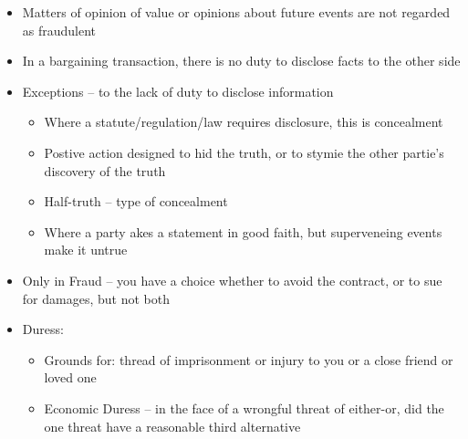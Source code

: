 \documentclass{article}
\begin{document}
\begin{itemize}
\begin{itemize}
		\end{itemize}
		\item Matters of opinion of value or opinions about future events are not regarded as fraudulent
		\item In a bargaining transaction, there is no duty to disclose facts to the other side
		\item Exceptions -- to the lack of duty to disclose information
		\begin{itemize}
			\item Where a statute/regulation/law requires disclosure, this is concealment
			\item Postive action designed to hid the truth, or to stymie the other partie's discovery of the truth
			\item Half-truth -- type of concealment
			\item Where a party akes a statement in good faith, but superveneing events make it untrue
		\end{itemize}
		\item Only in Fraud -- you have a choice whether to avoid the contract, or to sue for damages, but not both
		\item Duress:
		\begin{itemize}
			\item Grounds for: thread of imprisonment or injury to you or a close friend or loved one
			\item Economic Duress -- in the face of a wrongful threat of either-or, did the one threat have a reasonable third alternative
		\end{itemize}
	\end{itemize}
\end{document}

